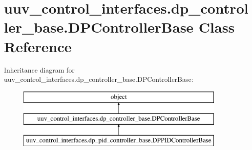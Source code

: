 \hypertarget{classuuv__control__interfaces_1_1dp__controller__base_1_1DPControllerBase}{}\section{uuv\+\_\+control\+\_\+interfaces.\+dp\+\_\+controller\+\_\+base.\+D\+P\+Controller\+Base Class Reference}
\label{classuuv__control__interfaces_1_1dp__controller__base_1_1DPControllerBase}
Inheritance diagram for uuv\+\_\+control\+\_\+interfaces.\+dp\+\_\+controller\+\_\+base.\+D\+P\+Controller\+Base\+:\begin{figure}[H]
\begin{center}
\leavevmode
\includegraphics[height=3.000000cm]{classuuv__control__interfaces_1_1dp__controller__base_1_1DPControllerBase}
\end{center}
\end{figure}

